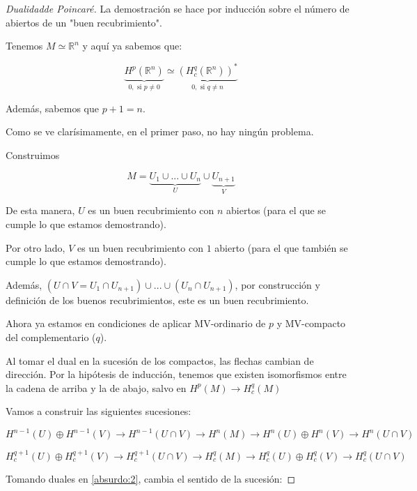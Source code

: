 \documentclass[palatino, bibnumbers]{apuntes}
\begin{document}
\begin{proof}[Dualidad\IS de Poincaré]

La demostración se hace por inducción sobre el número de abiertos de un "buen recubrimiento".


Tenemos $M \simeq ℝ^n$ y aquí ya sabemos que:

\[
	\underbrace{H^p(ℝ^n)}_{0, \text{ si }p≠0} \simeq \underbrace{\left(H_c^q(ℝ^n)\right)^{\ast}}_{0,\text{ si } q≠n}
\]

Además, sabemos que $p+1 = n$.

Como se ve clarísimamente, en el primer paso, no hay ningún problema.



Construimos

\[
	M = \underbrace{U_1 \cup ... \cup U_n}_{U} \cup \underbrace{U_{n+1}}_{V}
\]

De esta manera, $U$ es un buen recubrimiento con $n$ abiertos (para el que se cumple lo que estamos demostrando).

Por otro lado, $V$ es un buen recubrimiento con $1$ abierto (para el que también se cumple lo que estamos demostrando).

Además, $(U\cap V = U_1\cap U_{n+1})\cup ... \cup (U_n\cap U_{n+1})$, por construcción y definición de los buenos recubrimientos, este es un buen recubrimiento.

Ahora ya estamos en condiciones de aplicar MV-ordinario de $p$ y MV-compacto del complementario ($q$).

Al tomar el dual en la sucesión de los compactos, las flechas cambian de dirección. Por la hipótesis de inducción, tenemos que existen isomorfismos entre la cadena de arriba y la de abajo, salvo en $H^p(M) \to H^q_c(M)$

Vamos a construir las siguientes sucesiones:

\begin{equation*}
\label{absurdo:1}
H^{n-1}(U) \oplus H^{n-1}(V) \to H^{n-1}(U\cap V) \to H^n(M) \to H^{n}(U)\oplus H^n(V) \to H^n(U\cap V)
\end{equation*}

\begin{equation}
\label{absurdo:2}
H_c^{q+1}(U) \oplus H_c^{q+1}(V) \to H_c^{q+1}(U\cap V) \to H_c^q(M) \to H_c^{q}(U)\oplus H_c^q(V) \to H_c^q(U\cap V)
\end{equation}

Tomando duales en \ref{absurdo:2}, cambia el sentido de la sucesión:


\end{proof}
\end{document}
